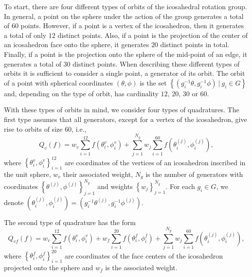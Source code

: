 \documentclass[landscape,a0b,final]{a0poster}
\newenvironment{poster}{
  \begin{center}
  \begin{minipage}[c]{0.98\textwidth}
}{
  \end{minipage} 
  \end{center}
}
\begin{document}
\begin{poster}
\begin{multicols}{3}
To start, there are four different types of orbits of the icosahedral
rotation group. In general, a point on the sphere under the action
of the group generates a total of $60$ points. However, if a point
is a vertex of the icosahedron, then it generates a total of only
$12$ distinct points. Also, if a point is the projection of the center
of an icosahedron face onto the sphere, it generates $20$ distinct
points in total. Finally, if a point is the projection onto the sphere
of the mid-point of an edge, it generates a total of $30$ distinct
points. When describing these different types of orbits it is sufficient
to consider a single point, a generator of its orbit. The orbit of
a point with spherical coordinates $\left(\theta,\phi\right)$ is
the set $\left\{ \left(g_{i}^{-1}\theta,g_{i}^{-1}\phi\right)\:|\: g_{i}\in G\right\} $
and, depending on the type of orbit, has cardinality $12$, $20$,
$30$ or $60$.

With these types of orbits in mind, we consider four types of quadratures.
The first type assumes that all generators, except for a vertex of
the icosahedron, give rise to orbits of size $60$, i.e., \begin{equation}
Q_{v}\left(f\right)=w_{v}\sum_{i=1}^{12}f\left(\theta_{i}^{v},\phi_{i}^{v}\right)+\sum_{j=1}^{N_{g}}w_{j}\sum_{i=1}^{60}f\left(\theta_{i}^{\left(j\right)},\phi_{i}^{\left(j\right)}\right),\label{eq:Q-v}\end{equation}
where $\left\{ \theta_{i}^{v},\phi_{i}^{v}\right\} _{i=1}^{12}$ are
coordinates of the vertices of an icosahedron inscribed in the unit
sphere, $w_{v}$ their associated weight, $N_{g}$ is the number of
generators with coordinates $\left\{ \theta^{\left(j\right)},\phi^{\left(j\right)}\right\} _{j=1}^{N_{g}}$
and weights $\left\{ w_{j}\right\} _{j=1}^{N_{g}}$. For each $g_{i}\in G$,
we denote $\left(\theta_{i}^{\left(j\right)},\phi_{i}^{\left(j\right)}\right)=\left(g_{i}^{-1}\theta^{\left(j\right)},g_{i}^{-1}\phi^{\left(j\right)}\right)$.

The second type of quadrature has the form
\begin{equation}
Q_{vf}\left(f\right)=w_{v}\sum_{i=1}^{12}f\left(\theta_{i}^{v},\phi_{i}^{v}\right)+w_{f}\sum_{i=1}^{20}f\left(\theta_{i}^{f},\phi_{i}^{f}\right)+\sum_{j=1}^{N_{g}}w_{j}\sum_{i=1}^{60}f\left(\theta_{i}^{\left(j\right)},\phi_{i}^{\left(j\right)}\right),\label{eq:Q-vf}
\end{equation}
where $\left\{ \theta_{i}^{f},\phi_{i}^{f}\right\} _{i=1}^{20}$ are
coordinates of the face centers of the icosahedron projected onto
the sphere and $w_{f}$ is the associated weight.


\end{multicols}
\end{poster}
\end{document}
